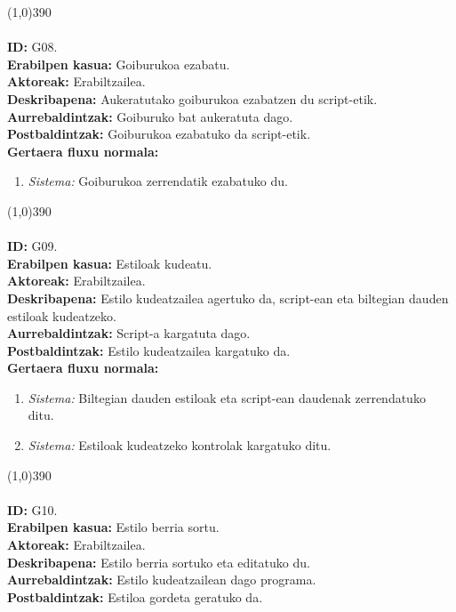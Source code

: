 \line(1,0){390}\\
\noindent\\
\textbf{ID:} G08.\\
\textbf{Erabilpen kasua:} Goiburukoa ezabatu.\\
\textbf{Aktoreak:} Erabiltzailea.\\
\textbf{Deskribapena:} Aukeratutako goiburukoa ezabatzen du script-etik.\\
\textbf{Aurrebaldintzak:} Goiburuko bat aukeratuta dago.\\
\textbf{Postbaldintzak:} Goiburukoa ezabatuko da script-etik.\\
\textbf{Gertaera fluxu normala:}
\begin{enumerate}
	\item \textit{Sistema:} Goiburukoa zerrendatik ezabatuko du.
\end{enumerate}
\line(1,0){390}\\
\noindent\\
\textbf{ID:} G09.\\
\textbf{Erabilpen kasua:} Estiloak kudeatu.\\
\textbf{Aktoreak:} Erabiltzailea.\\
\textbf{Deskribapena:} Estilo kudeatzailea agertuko da, script-ean eta biltegian dauden estiloak kudeatzeko.\\
\textbf{Aurrebaldintzak:} Script-a kargatuta dago.\\
\textbf{Postbaldintzak:} Estilo kudeatzailea kargatuko da.\\
\textbf{Gertaera fluxu normala:}
\begin{enumerate}
	\item \textit{Sistema:} Biltegian dauden estiloak eta script-ean daudenak zerrendatuko ditu.
	\item \textit{Sistema:} Estiloak kudeatzeko kontrolak kargatuko ditu.
\end{enumerate}
\line(1,0){390}\\
\noindent\\
\textbf{ID:} G10.\\
\textbf{Erabilpen kasua:} Estilo berria sortu.\\
\textbf{Aktoreak:} Erabiltzailea.\\
\textbf{Deskribapena:} Estilo berria sortuko eta editatuko du.\\
\textbf{Aurrebaldintzak:} Estilo kudeatzailean dago programa.\\
\textbf{Postbaldintzak:} Estiloa gordeta geratuko da.\\
